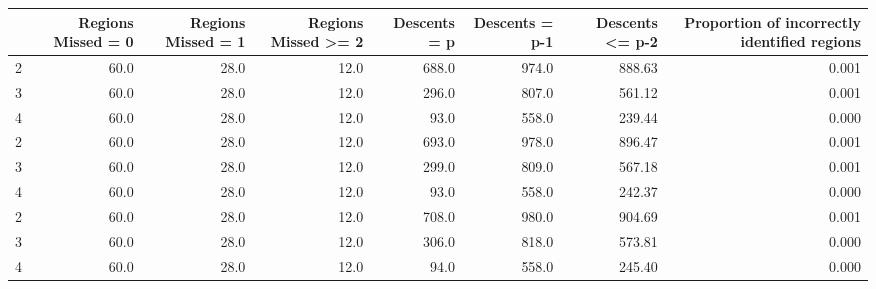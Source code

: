 \begin{tabular}{lrrrrrrr}
\toprule
{} &  Regions Missed = 0 &  Regions Missed = 1 &  Regions Missed >= 2 &  Descents = p &  Descents = p-1 &  Descents <= p-2 &  Proportion of incorrectly identified regions \\
\midrule
2 &                60.0 &                28.0 &                 12.0 &         688.0 &           974.0 &           888.63 &                                         0.001 \\
3 &                60.0 &                28.0 &                 12.0 &         296.0 &           807.0 &           561.12 &                                         0.001 \\
4 &                60.0 &                28.0 &                 12.0 &          93.0 &           558.0 &           239.44 &                                         0.000 \\
2 &                60.0 &                28.0 &                 12.0 &         693.0 &           978.0 &           896.47 &                                         0.001 \\
3 &                60.0 &                28.0 &                 12.0 &         299.0 &           809.0 &           567.18 &                                         0.001 \\
4 &                60.0 &                28.0 &                 12.0 &          93.0 &           558.0 &           242.37 &                                         0.000 \\
2 &                60.0 &                28.0 &                 12.0 &         708.0 &           980.0 &           904.69 &                                         0.001 \\
3 &                60.0 &                28.0 &                 12.0 &         306.0 &           818.0 &           573.81 &                                         0.000 \\
4 &                60.0 &                28.0 &                 12.0 &          94.0 &           558.0 &           245.40 &                                         0.000 \\
\bottomrule
\end{tabular}
